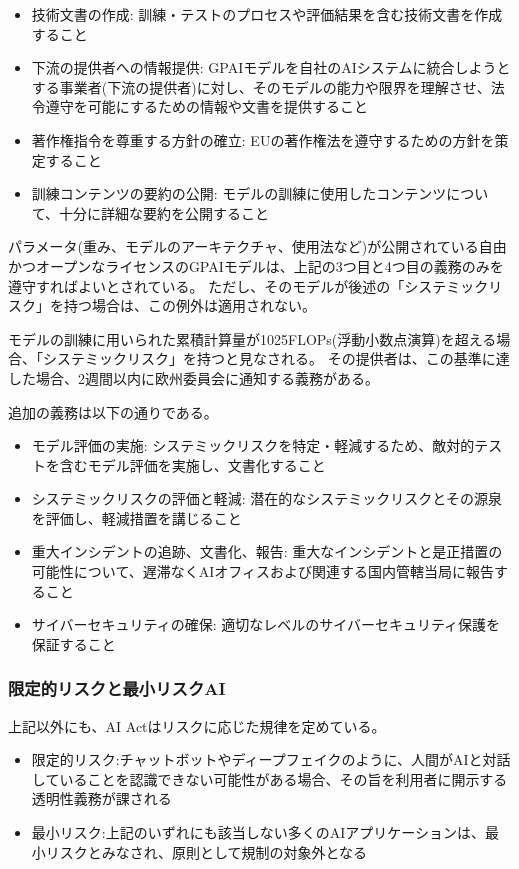 \begin{itemize}
    \item 技術文書の作成: 訓練・テストのプロセスや評価結果を含む技術文書を作成すること
    \item 下流の提供者への情報提供: GPAIモデルを自社のAIシステムに統合しようとする事業者(下流の提供者)に対し、そのモデルの能力や限界を理解させ、法令遵守を可能にするための情報や文書を提供すること
    \item 著作権指令を尊重する方針の確立: EUの著作権法を遵守するための方針を策定すること
    \item 訓練コンテンツの要約の公開: モデルの訓練に使用したコンテンツについて、十分に詳細な要約を公開すること
\end{itemize}

パラメータ(重み、モデルのアーキテクチャ、使用法など)が公開されている自由かつオープンなライセンスのGPAIモデルは、上記の3つ目と4つ目の義務のみを遵守すればよいとされている。
ただし、そのモデルが後述の「システミックリスク」を持つ場合は、この例外は適用されない。

モデルの訓練に用いられた累積計算量が1025FLOPs(浮動小数点演算)を超える場合、「システミックリスク」を持つと見なされる。
その提供者は、この基準に達した場合、2週間以内に欧州委員会に通知する義務がある。

追加の義務は以下の通りである。

\begin{itemize}
    \item モデル評価の実施: システミックリスクを特定・軽減するため、敵対的テストを含むモデル評価を実施し、文書化すること
    \item システミックリスクの評価と軽減: 潜在的なシステミックリスクとその源泉を評価し、軽減措置を講じること
    \item 重大インシデントの追跡、文書化、報告: 重大なインシデントと是正措置の可能性について、遅滞なくAIオフィスおよび関連する国内管轄当局に報告すること
    \item サイバーセキュリティの確保: 適切なレベルのサイバーセキュリティ保護を保証すること
\end{itemize}


\subsubsection{限定的リスクと最小リスクAI}

上記以外にも、AI Actはリスクに応じた規律を定めている。

\begin{itemize}
    \item 限定的リスク:チャットボットやディープフェイクのように、人間がAIと対話していることを認識できない可能性がある場合、その旨を利用者に開示する透明性義務が課される
    \item 最小リスク:上記のいずれにも該当しない多くのAIアプリケーションは、最小リスクとみなされ、原則として規制の対象外となる
\end{itemize}



